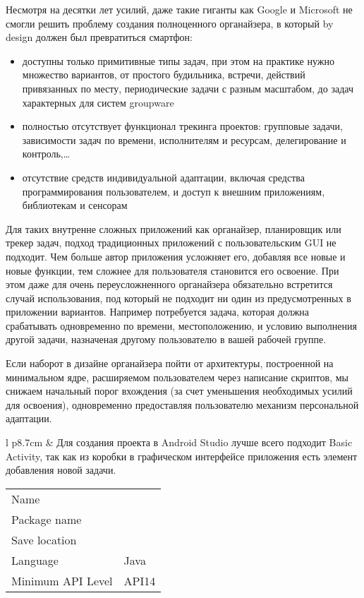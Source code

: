 \noindent
Несмотря на десятки лет усилий, даже такие гиганты как Google и Microsoft не
смогли решить проблему создания полноценного органайзера, в который by design
должен был превратиться смартфон:
\begin{itemize}
  \item доступны только примитивные типы задач, при этом на практике нужно
  множество вариантов, от простого будильника, встречи, действий привязанных по
  месту, периодические задачи с разным масштабом, до задач характерных для систем
  groupware
  \item полностью отсутствует функционал трекинга проектов: групповые
  задачи, зависимости задач по времени, исполнителям и ресурсам, делегирование и
  контроль,\ldots
  \item отсутствие средств индивидуальной адаптации, включая средства
  программирования пользователем, и доступ к внешним приложениям, библиотекам и
  сенсорам
\end{itemize}

\noindent
Для таких внутренне сложных приложений как органайзер, планировщик или трекер
задач, подход традиционных приложений с пользовательским GUI не подходит. Чем
больше автор приложения усложняет его, добавляя все новые и новые функции, тем
сложнее для пользователя становится его освоение. При этом даже для
очень переусложненного органайзера обязательно встретится случай использования,
под который не подходит ни один из предусмотренных в приложении вариантов.
Например потребуется задача, которая должна срабатывать одновременно по времени,
местоположению, и условию выполнения другой задачи, назначеная другому
пользователю в вашей рабочей группе.

Если наборот в дизайне органайзера пойти от архитектуры, построенной на
минимальном ядре, расширяемом пользователем через написание скриптов, мы снижаем
начальный порог вхождения (за счет уменьшения необходимых усилий для освоения),
одновременно предоставляя пользователю механизм персональной адаптации.

\medskip\noindent
\begin{tabular}{l p{8.7cm}}
 &
Для создания проекта в Android Studio лучше всего подходит Basic Activity, так
как из коробки в графическом интерфейсе приложения есть элемент добавления новой
задачи.

\medskip
\begin{tabular}{l l}
Name & \metal \\
Package name & \file{io.github.ponyatov.metal} \\
Save location & \file{/home/ponyatov/metaL/Android} \\
Language & Java \\
Minimum API Level & API14\\
\end{tabular}
\\
\end{tabular}


